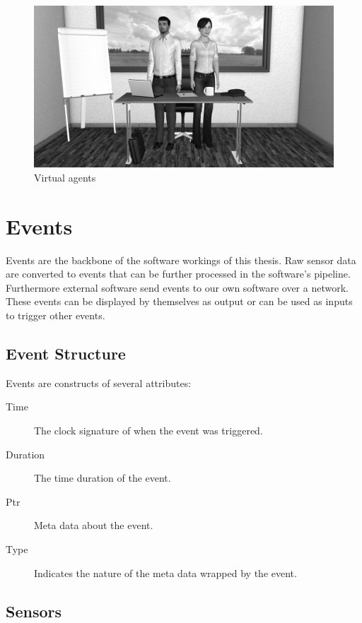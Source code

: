 \documentclass[12pt, a4paper, fleqn]{memoir}%
\begin{document}
\begin{figure}[h]
    \centering
    \includegraphics[width=1\textwidth]{agents}
    \caption{Virtual agents}
    \label{fig:image_img}
\end{figure}

\chapter{Events}
\label{chap:Events}
Events are the backbone of the software workings of this thesis. Raw sensor data are converted to events that can be further processed in the software's pipeline. Furthermore external software send events to our own software over a network. These events can be displayed by themselves as output or can be used as inputs to trigger other events.

\section{Event Structure}
Events are constructs of several attributes:

\begin{description}
  \item[Time] The clock signature of when the event was triggered.
  \item[Duration] The time duration of the event.
  \item[Ptr] Meta data about the event.
  \item[Type] Indicates the nature of the meta data wrapped by the event.
\end{description}

\section{Sensors}
\label{sec:Sensors}
\end{document}
